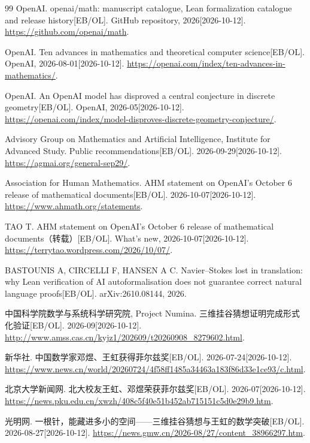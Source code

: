 \begin{thebibliography}{99}
OpenAI. openai/math: manuscript catalogue, Lean formalization catalogue and release history[EB/OL]. GitHub repository, 2026[2026-10-12]. \url{https://github.com/openai/math}.

OpenAI. Ten advances in mathematics and theoretical computer science[EB/OL]. OpenAI, 2026-08-01[2026-10-12]. \url{https://openai.com/index/ten-advances-in-mathematics/}.

OpenAI. An OpenAI model has disproved a central conjecture in discrete geometry[EB/OL]. OpenAI, 2026-05[2026-10-12]. \url{https://openai.com/index/model-disproves-discrete-geometry-conjecture/}.

Advisory Group on Mathematics and Artificial Intelligence, Institute for Advanced Study. Public recommendations[EB/OL]. 2026-09-29[2026-10-12]. \url{https://agmai.org/general-sep29/}.

Association for Human Mathematics. AHM statement on OpenAI's October 6 release of mathematical documents[EB/OL]. 2026-10-07[2026-10-12]. \url{https://www.ahmath.org/statements}.

TAO T. AHM statement on OpenAI's October 6 release of mathematical documents（转载）[EB/OL]. What's new, 2026-10-07[2026-10-12]. \url{https://terrytao.wordpress.com/2026/10/07/}.

BASTOUNIS A, CIRCELLI F, HANSEN A C. Navier--Stokes lost in translation: why Lean verification of AI autoformalisation does not guarantee correct natural language proofs[EB/OL]. arXiv:2610.08144, 2026.

中国科学院数学与系统科学研究院, Project Numina. 三维挂谷猜想证明完成形式化验证[EB/OL]. 2026-09[2026-10-12]. \url{http://www.amss.cas.cn/kyjz1/202609/t20260908_8279602.html}.

新华社. 中国数学家邓煜、王虹获得菲尔兹奖[EB/OL]. 2026-07-24[2026-10-12]. \url{https://www.news.cn/world/20260724/4f58ff1485a34463a183f86d33e1ce93/c.html}.

北京大学新闻网. 北大校友王虹、邓煜荣获菲尔兹奖[EB/OL]. 2026-07[2026-10-12]. \url{https://news.pku.edu.cn/xwzh/408c5f40e51b452ab715151c5d0e29b9.htm}.

光明网. 一根针，能藏进多小的空间——三维挂谷猜想与王虹的数学突破[EB/OL]. 2026-08-27[2026-10-12]. \url{https://news.gmw.cn/2026-08/27/content_38966297.htm}.

\end{thebibliography}